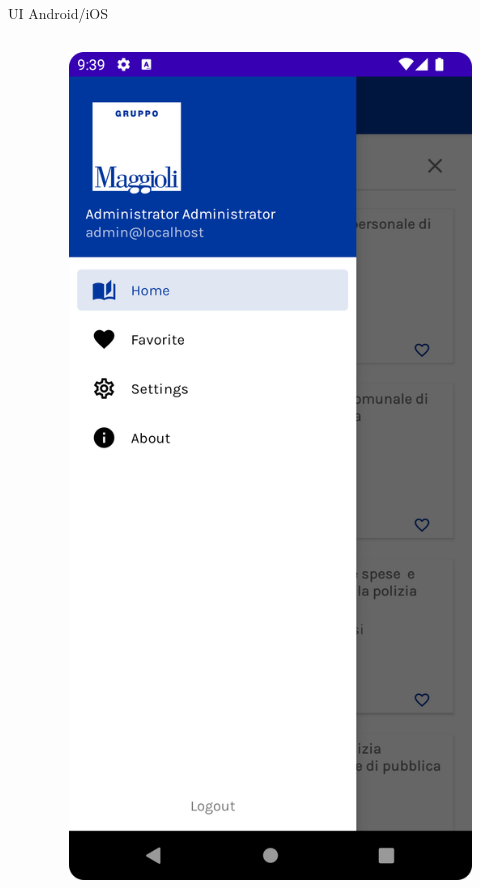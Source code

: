 \begin{frame}{UI Android/iOS}
\begin{columns}[onlytextwidth]
\begin{column}{0.14\textwidth}
        \end{column}
        \begin{column}{0.14\textwidth}
        
            \begin{figure}[H]
                \includegraphics[width=1\textwidth]{img/sidenav.png}
            \end{figure}
            

\end{column}
\end{columns}
\end{frame}
